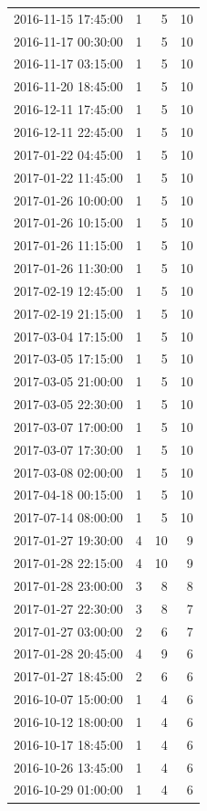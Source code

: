 \begin{tabular}{lrrr}
2016-11-15 17:45:00 & 1 & 5 & 10 \\
2016-11-17 00:30:00 & 1 & 5 & 10 \\
2016-11-17 03:15:00 & 1 & 5 & 10 \\
2016-11-20 18:45:00 & 1 & 5 & 10 \\
2016-12-11 17:45:00 & 1 & 5 & 10 \\
2016-12-11 22:45:00 & 1 & 5 & 10 \\
2017-01-22 04:45:00 & 1 & 5 & 10 \\
2017-01-22 11:45:00 & 1 & 5 & 10 \\
2017-01-26 10:00:00 & 1 & 5 & 10 \\
2017-01-26 10:15:00 & 1 & 5 & 10 \\
2017-01-26 11:15:00 & 1 & 5 & 10 \\
2017-01-26 11:30:00 & 1 & 5 & 10 \\
2017-02-19 12:45:00 & 1 & 5 & 10 \\
2017-02-19 21:15:00 & 1 & 5 & 10 \\
2017-03-04 17:15:00 & 1 & 5 & 10 \\
2017-03-05 17:15:00 & 1 & 5 & 10 \\
2017-03-05 21:00:00 & 1 & 5 & 10 \\
2017-03-05 22:30:00 & 1 & 5 & 10 \\
2017-03-07 17:00:00 & 1 & 5 & 10 \\
2017-03-07 17:30:00 & 1 & 5 & 10 \\
2017-03-08 02:00:00 & 1 & 5 & 10 \\
2017-04-18 00:15:00 & 1 & 5 & 10 \\
2017-07-14 08:00:00 & 1 & 5 & 10 \\
2017-01-27 19:30:00 & 4 & 10 & 9 \\
2017-01-28 22:15:00 & 4 & 10 & 9 \\
2017-01-28 23:00:00 & 3 & 8 & 8 \\
2017-01-27 22:30:00 & 3 & 8 & 7 \\
2017-01-27 03:00:00 & 2 & 6 & 7 \\
2017-01-28 20:45:00 & 4 & 9 & 6 \\
2017-01-27 18:45:00 & 2 & 6 & 6 \\
2016-10-07 15:00:00 & 1 & 4 & 6 \\
2016-10-12 18:00:00 & 1 & 4 & 6 \\
2016-10-17 18:45:00 & 1 & 4 & 6 \\
2016-10-26 13:45:00 & 1 & 4 & 6 \\
2016-10-29 01:00:00 & 1 & 4 & 6 \\

\end{tabular}
